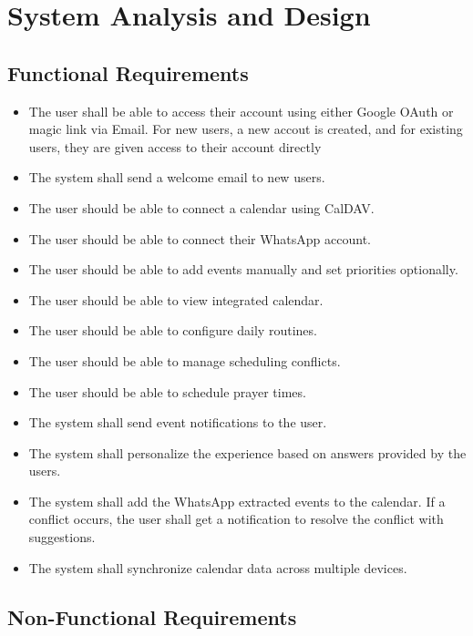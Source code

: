 \documentclass[12pt,a4paper]{report}
\begin{document}
\chapter{System Analysis and Design}

\section{Functional Requirements}

\begin{itemize}
    \item The user shall be able to access their account using either Google OAuth or magic link via Email. For new users, a new accout is created, and for existing users, they are given access to their account directly
    \item The system shall send a welcome email to new users.
    \item The user should be able to connect a calendar using CalDAV.
    \item The user should be able to connect their WhatsApp account.
    \item The user should be able to add events manually and set priorities optionally.
    \item The user should be able to view integrated calendar.
    \item The user should be able to configure daily routines.
    \item The user should be able to manage scheduling conflicts.
    \item The user should be able to schedule prayer times.
    \item The system shall send event notifications to the user.
    \item The system shall personalize the experience based on answers provided by the users.
    \item The system shall add the WhatsApp extracted events to the calendar. If a conflict occurs, the user shall get a notification to resolve the conflict with suggestions.
    \item The system shall synchronize calendar data across multiple devices.
\end{itemize}

\section{Non-Functional Requirements}
\end{document}
